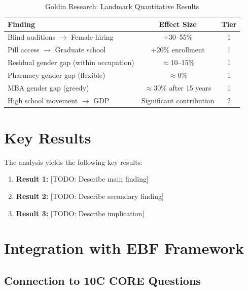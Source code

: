 \begin{table}[htbp]
\centering
\caption{Goldin Research: Landmark Quantitative Results}
\label{tab:goldin-results}
\renewcommand{\arraystretch}{1.3}
\small
\begin{tabular}{@{}p{5cm}cc@{}}
\toprule
\textbf{Finding} & \textbf{Effect Size} & \textbf{Tier} \\
\midrule
Blind auditions $\rightarrow$ Female hiring & +30--55\% & 1 \\
Pill access $\rightarrow$ Graduate school & +20\% enrollment & 1 \\
Residual gender gap (within occupation) & $\approx$10--15\% & 1 \\
Pharmacy gender gap (flexible) & $\approx$0\% & 1 \\
MBA gender gap (greedy) & $\approx$30\% after 15 years & 1 \\
High school movement $\rightarrow$ GDP & Significant contribution & 2 \\
\bottomrule
\end{tabular}
\end{table}


\section{Key Results}
\label{sec:results}

The analysis yields the following key results:

\begin{enumerate}
    \item \textbf{Result 1:} [TODO: Describe main finding]
    \item \textbf{Result 2:} [TODO: Describe secondary finding]
    \item \textbf{Result 3:} [TODO: Describe implication]
\end{enumerate}

\section{Integration with EBF Framework}

\subsection{Connection to 10C CORE Questions}

